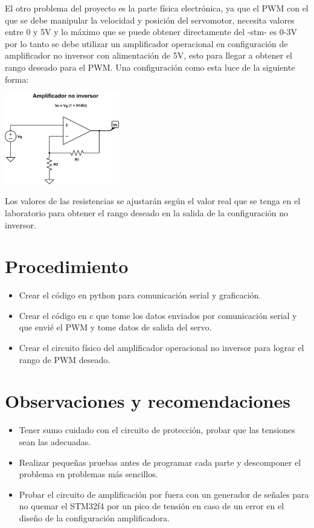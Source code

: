 \documentclass[letterpaper]{article}
\begin{document}
El otro problema del proyecto es la parte física electrónica, ya que el PWM con el que se debe manipular la velocidad y posición del servomotor, necesita valores entre 0 y 5V y lo máximo que se puede obtener directamente del -stm- es 0-3V por lo tanto se debe utilizar un amplificador operacional en configuración de amplificador no inversor con alimentación de 5V, esto para llegar a obtener el rango deseado para el PWM. Una configuración como esta luce de la siguiente forma:\\

\begin{center}
\includegraphics[width=5cm]{amp.png}
\end{center}

Los valores de las resistencias se ajustarán según el valor real que se tenga en el laboratorio para obtener el rango deseado en la salida de la configuración no inversor.

\section{Procedimiento}
\begin{itemize}
\item Crear el código en python para comunicación serial y graficación.
\item Crear el código en c que tome los datos enviados por comunicación serial y que envié el PWM y tome datos de salida del servo.
\item Crear el circuito físico del amplificador operacional no inversor para lograr el rango de PWM deseado.
\end{itemize}

\section{Observaciones y recomendaciones}

\begin{itemize}
\item Tener sumo cuidado con el circuito de protección, probar que las tensiones sean las adecuadas.
\item Realizar pequeñas pruebas antes de programar cada parte y descomponer el problema en problemas más sencillos.
\item Probar el circuito de amplificación por fuera con un generador de señales para no quemar el STM32f4 por un pico de tensión en caso de un error en el diseño de la configuración amplificadora.
\end{itemize}

 

\end{document}
